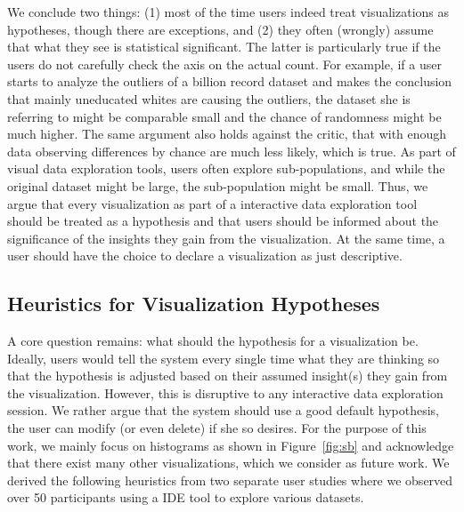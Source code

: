 We conclude two things: (1) most of the time users indeed treat visualizations as hypotheses, though there are exceptions, and (2) they often (wrongly) assume that what they see is statistical significant. 
The latter is particularly true if the users do not carefully check the axis on the actual count.  
For example, if a user starts to analyze the outliers of a billion record dataset and makes the conclusion that mainly uneducated whites are causing the outliers, the dataset she is referring to might be comparable small and the chance of randomness might be much higher. 
The same argument also holds against the critic, that with enough data observing differences by chance are much less likely, which is true. 
As part of visual data exploration tools, users often explore sub-populations, and while the original dataset might be large, the sub-population might be small. 
Thus, we argue that every visualization as part of a interactive data exploration tool should be treated as a hypothesis and that users should be informed about the significance of the insights they gain from the visualization. 
At the same time, a user should have the choice to declare a visualization as just descriptive. 


\subsection{Heuristics for Visualization Hypotheses}
A core question remains: what should the hypothesis for a visualization be. 
Ideally, users would tell the system every single time what they are thinking so that the hypothesis is adjusted based on their assumed insight(s) they gain from the visualization. 
However, this is disruptive to any interactive data exploration session. 
We rather argue that the system should use a good default hypothesis, the user can modify (or even delete) if she so desires. 
For the purpose of this work, we mainly focus on histograms as shown in Figure~\ref{fig:sb} and acknowledge that there exist many other visualizations, which we consider as future work. 
We derived the following heuristics from two separate user studies where we observed over 50 participants using a IDE tool to explore various datasets. 

